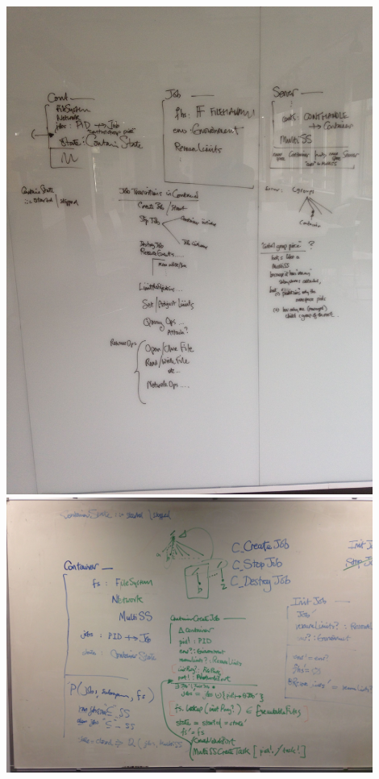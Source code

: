 \documentclass[a4paper,twoside,12pt]{article}
\begin{document}
\includegraphics[width=0.9\textwidth]{pics/IMG_0687.jpg}\\
\includegraphics[width=0.9\textwidth]{pics/IMG_0690.jpg}\\
\end{document}
